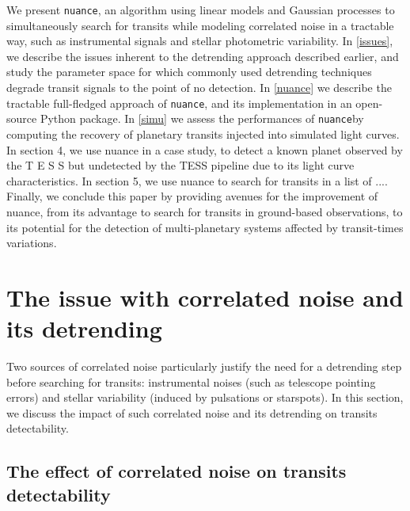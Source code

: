 \documentclass{aastex631}
\newcommand{\nuance}{\texttt{nuance}}
\begin{document}
We present \nuance, an algorithm using linear models and Gaussian processes to simultaneously search for transits while modeling correlated noise in a tractable way, such as instrumental signals and stellar photometric variability. In \autoref{issues}, we describe the issues inherent to the detrending approach described earlier, and study the parameter space for which commonly used detrending techniques degrade transit signals to the point of no detection. In \autoref{nuance} we describe the tractable full-fledged approach of  \nuance, and its implementation in an open-source Python package. In \autoref{simu} we assess the performances of \nuance by computing the recovery of planetary transits injected into simulated light curves. In section 4, we use nuance in a case study, to detect a known planet observed by the T E S S but undetected by the TESS pipeline due to its light curve characteristics. In section 5, we use nuance to search for transits in a list of .... Finally, we conclude this paper by providing avenues for the improvement of nuance, from its advantage to search for transits in ground-based observations, to its potential for the detection of multi-planetary systems affected by transit-times variations.

\section{The issue with correlated noise and its detrending}\label{issues}
Two sources of correlated noise particularly justify the need for a detrending step before searching for transits: instrumental noises (such as telescope pointing errors) and stellar variability (induced by pulsations or starspots). In this section, we discuss the impact of such correlated noise and its detrending on transits detectability.

\subsection{The effect of correlated noise on transits detectability}
\end{document}
